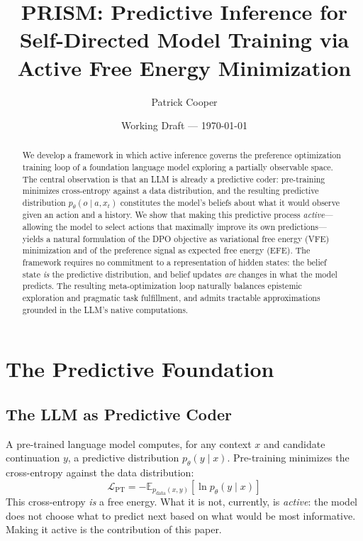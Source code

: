 \documentclass[11pt]{article}
\title{PRISM: Predictive Inference for Self-Directed Model Training via Active Free Energy Minimization}
\author{Patrick Cooper}
\date{Working Draft --- \today}
\newcommand{\Esub}[2]{\mathbb{E}_{#1}\!\left[#2\right]}
\begin{document}
\maketitle

\begin{abstract}
We develop a framework in which active inference governs the preference optimization training loop of a foundation language model exploring a partially observable space. The central observation is that an LLM is already a predictive coder: pre-training minimizes cross-entropy against a data distribution, and the resulting predictive distribution $p_\theta(o \mid a, x_t)$ constitutes the model's beliefs about what it would observe given an action and a history. We show that making this predictive process \emph{active}---allowing the model to select actions that maximally improve its own predictions---yields a natural formulation of the DPO objective as variational free energy (VFE) minimization and of the preference signal as expected free energy (EFE). The framework requires no commitment to a representation of hidden states: the belief state \emph{is} the predictive distribution, and belief updates \emph{are} changes in what the model predicts. The resulting meta-optimization loop naturally balances epistemic exploration and pragmatic task fulfillment, and admits tractable approximations grounded in the LLM's native computations.
\end{abstract}

\tableofcontents
\newpage

\section{The Predictive Foundation}
\label{sec:foundation}

\subsection{The LLM as Predictive Coder}

A pre-trained language model computes, for any context $x$ and candidate continuation $y$, a predictive distribution $p_\theta(y \mid x)$. Pre-training minimizes the cross-entropy against the data distribution:
\begin{equation}
\label{eq:pretraining}
\mathcal{L}_{\mathrm{PT}} = -\Esub{p_{\mathrm{data}}(x,y)}{\ln p_\theta(y \mid x)}
\end{equation}
This cross-entropy \emph{is} a free energy. What it is not, currently, is \emph{active}: the model does not choose what to predict next based on what would be most informative. Making it active is the contribution of this paper.
\end{document}
